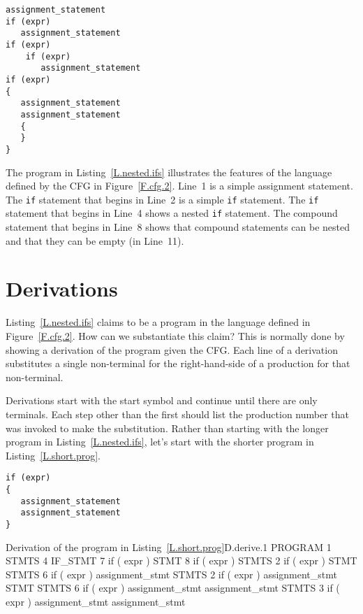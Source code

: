 \documentclass[letterpaper,12pt,openany,reqno]{book}%
\newcommand{\code}[1] {\lstinline[breaklines=yes,breakatwhitespace=yes]{#1}}
\begin{document}
\begin{lstlisting}[caption={Sample program in the language defined by the CFG in Figure~\ref{F.cfg.2}},label=L.nested.ifs]
assignment_statement
if (expr)
   assignment_statement
if (expr)
    if (expr)
       assignment_statement
if (expr)
{
   assignment_statement
   assignment_statement
   {
   }
}
\end{lstlisting}

The program in Listing~\ref{L.nested.ifs} illustrates the features of the language defined by the CFG in Figure~\ref{F.cfg.2}. Line~1 is a simple assignment statement. The \code{if} statement that begins in Line~2 is a simple \code{if} statement. The \code{if} statement that begins in Line~4 shows a nested \code{if} statement. The compound statement that begins in Line~8 shows that compound statements can be nested and that they can be empty (in Line~11).

\section{Derivations}

Listing~\ref{L.nested.ifs} claims to be a program in the language defined in Figure~\ref{F.cfg.2}. How can we substantiate this claim? This is normally done by showing a derivation of the program given the CFG. Each line of a derivation substitutes a single non-terminal for the right-hand-side of a production for that non-terminal. 

Derivations start with the start symbol and continue until there are only terminals. Each step other than the first should list the production number that was invoked to make the substitution. Rather than starting with the longer program in Listing~\ref{L.nested.ifs}, let's start with the shorter program in Listing~\ref{L.short.prog}.

\begin{lstlisting}[caption={Short program program in the language defined by the CFG in Figure~\ref{F.cfg.2}. The derivation of this program is given in Derivation~\ref{D.derive.1}},label=L.short.prog]
if (expr)
{
   assignment_statement
   assignment_statement
}
\end{lstlisting}

\begin{derivation}{Derivation of the program in Listing~\ref{L.short.prog}}{D.derive.1}
    PROGRAM
1   STMTS
4   IF_STMT
7   if ( expr ) STMT
8   if ( expr ) { STMTS }
2   if ( expr ) { STMT STMTS }
6   if ( expr ) { assignment_stmt STMTS }
2   if ( expr ) { assignment_stmt STMT STMTS }
6   if ( expr ) { assignment_stmt assignment_stmt STMTS }
3   if ( expr ) { assignment_stmt assignment_stmt }
\end{derivation}
\end{document}
